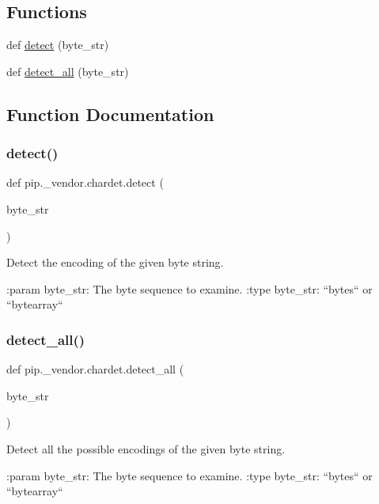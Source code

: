 \subsection*{Functions}
\begin{DoxyCompactItemize}
\item 
def \hyperlink{namespacepip_1_1__vendor_1_1chardet_ab15e4707617933abec1db357bf0ab9a3}{detect} (byte\+\_\+str)
\item 
def \hyperlink{namespacepip_1_1__vendor_1_1chardet_acc1ed5d3dc7540cefb5c3831521310e6}{detect\+\_\+all} (byte\+\_\+str)
\end{DoxyCompactItemize}


\subsection{Function Documentation}
\mbox{\label{namespacepip_1_1__vendor_1_1chardet_ab15e4707617933abec1db357bf0ab9a3}} 
\subsubsection{\texorpdfstring{detect()}{detect()}}
{\footnotesize\ttfamily def pip.\+\_\+vendor.\+chardet.\+detect (\begin{DoxyParamCaption}\item[{}]{byte\+\_\+str }\end{DoxyParamCaption})}

\begin{DoxyVerb}Detect the encoding of the given byte string.

:param byte_str:     The byte sequence to examine.
:type byte_str:      ``bytes`` or ``bytearray``
\end{DoxyVerb}
 \mbox{\label{namespacepip_1_1__vendor_1_1chardet_acc1ed5d3dc7540cefb5c3831521310e6}} 
\subsubsection{\texorpdfstring{detect\+\_\+all()}{detect\_all()}}
{\footnotesize\ttfamily def pip.\+\_\+vendor.\+chardet.\+detect\+\_\+all (\begin{DoxyParamCaption}\item[{}]{byte\+\_\+str }\end{DoxyParamCaption})}

\begin{DoxyVerb}Detect all the possible encodings of the given byte string.

:param byte_str:     The byte sequence to examine.
:type byte_str:      ``bytes`` or ``bytearray``
\end{DoxyVerb}
 